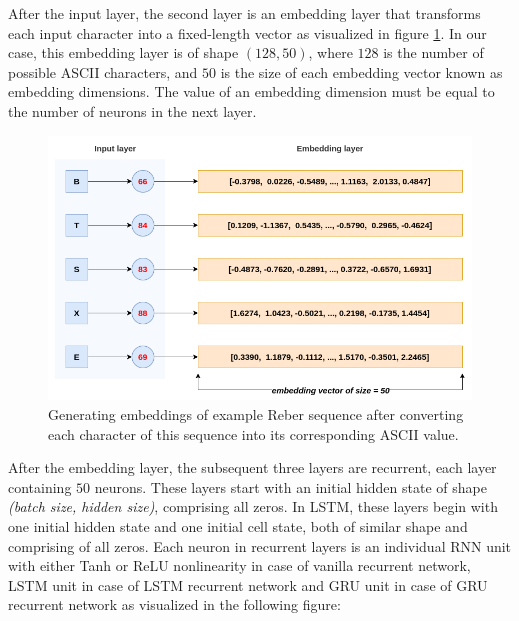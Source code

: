 After the input layer, the second layer is an embedding layer that transforms each input character into a fixed-length vector as visualized in figure \ref{fig:input-to-embedding}. In our case, this embedding layer is of shape $(128, 50)$, where $128$ is the number of possible ASCII characters, and $50$ is the size of each embedding vector known as embedding dimensions. The value of an embedding dimension must be equal to the number of neurons in the next layer.

\begin{figure}[h]
	\centering
	\includegraphics[width=0.85\linewidth]{images/experiments/input-to-embedding.png}
	\caption[Generating embeddings of example input sequence]%
	{Generating embeddings of example Reber sequence after converting each character of this sequence into its corresponding ASCII value.}
	\label{fig:input-to-embedding}
\end{figure}

After the embedding layer, the subsequent three layers are recurrent, each layer containing $50$ neurons. These layers start with an initial hidden state of shape \textit{(batch size, hidden size)}, comprising all zeros. In LSTM, these layers begin with one initial hidden state and one initial cell state, both of similar shape and comprising of all zeros. Each neuron in recurrent layers is an individual RNN unit with either Tanh or ReLU nonlinearity in case of vanilla recurrent network, LSTM unit in case of LSTM recurrent network and GRU unit in case of GRU recurrent network as visualized in the following figure:

